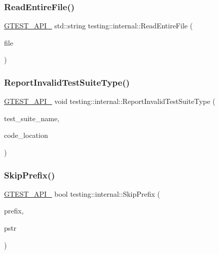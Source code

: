 \subsubsection{\texorpdfstring{Read\+Entire\+File()}{ReadEntireFile()}}
{\footnotesize\ttfamily \hyperlink{gtest-port_8h_aa73be6f0ba4a7456180a94904ce17790}{G\+T\+E\+S\+T\+\_\+\+A\+P\+I\+\_\+} std\+::string testing\+::internal\+::\+Read\+Entire\+File (\begin{DoxyParamCaption}\item[{F\+I\+LE $\ast$}]{file }\end{DoxyParamCaption})}

\mbox{\label{namespacetesting_1_1internal_a5d3e97443d23bf1824f87feb172efd39}} 
\subsubsection{\texorpdfstring{Report\+Invalid\+Test\+Suite\+Type()}{ReportInvalidTestSuiteType()}}
{\footnotesize\ttfamily \hyperlink{gtest-port_8h_aa73be6f0ba4a7456180a94904ce17790}{G\+T\+E\+S\+T\+\_\+\+A\+P\+I\+\_\+} void testing\+::internal\+::\+Report\+Invalid\+Test\+Suite\+Type (\begin{DoxyParamCaption}\item[{const char $\ast$}]{test\+\_\+suite\+\_\+name,  }\item[{\hyperlink{structtesting_1_1internal_1_1CodeLocation}{Code\+Location}}]{code\+\_\+location }\end{DoxyParamCaption})}

\mbox{\label{namespacetesting_1_1internal_aac72b20299ad4a99554ce161e1769560}} 
\subsubsection{\texorpdfstring{Skip\+Prefix()}{SkipPrefix()}}
{\footnotesize\ttfamily \hyperlink{gtest-port_8h_aa73be6f0ba4a7456180a94904ce17790}{G\+T\+E\+S\+T\+\_\+\+A\+P\+I\+\_\+} bool testing\+::internal\+::\+Skip\+Prefix (\begin{DoxyParamCaption}\item[{const char $\ast$}]{prefix,  }\item[{const char $\ast$$\ast$}]{pstr }\end{DoxyParamCaption})}

